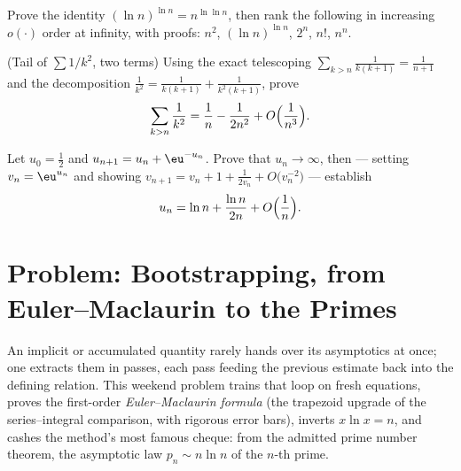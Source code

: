 \begin{exercise}[$\star$]\label{exo:b2:comparison:10}
Prove the identity $(\ln n)^{\ln n} = n^{\ln\ln n}$, then rank the
following in increasing $o(\cdot)$ order at infinity, with
proofs: $n^2$, $(\ln n)^{\ln n}$, $2^n$, $n!$, $n^n$.
\end{exercise}

\begin{exercise}[$\star\star$]\label{exo:b2:comparison:11}
(Tail of $\sum 1/k^2$, two terms) Using the exact telescoping
$\sum_{k > n} \frac{1}{k(k+1)} = \frac{1}{n+1}$ and the
decomposition $\frac1{k^2} = \frac{1}{k(k+1)} +
\frac{1}{k^2(k+1)}$, prove
\[
\sum_{k > n} \frac{1}{k^2}
= \frac1n - \frac{1}{2n^2} + O\Bigl(\frac{1}{n^3}\Bigr).
\]
\end{exercise}

\begin{exercise}[$\star\star\star$]\label{exo:b2:comparison:12}
Let $u_0 = \frac12$ and $u_{n+1} = u_n + \eu^{-u_n}$. Prove that
$u_n \to \infty$, then --- setting $v_n = \eu^{u_n}$ and showing
$v_{n+1} = v_n + 1 + \frac{1}{2v_n} + O\bigl(v_n^{-2}\bigr)$ ---
establish
\[
u_n = \ln n + \frac{\ln n}{2n} + O\Bigl(\frac1n\Bigr).
\]
\end{exercise}

\section{Problem: Bootstrapping, from Euler--Maclaurin to the
Primes}

An implicit or accumulated quantity rarely hands over its
asymptotics at once; one extracts them in passes, each pass
feeding the previous estimate back into the defining relation.
This weekend problem trains that loop on fresh equations, proves
the first-order \emph{Euler--Maclaurin formula} (the trapezoid
upgrade of the series--integral comparison, with rigorous error
bars), inverts $x\ln x = n$, and cashes the method's most famous
cheque: from the admitted prime number theorem, the asymptotic
law $p_n \sim n\ln n$ of the $n$-th prime.

